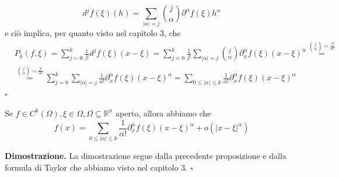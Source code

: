 	\[d^j f(\xi)(h) = \sum_{|\alpha| = j} \binom{j}{\alpha} \partial^{\alpha} f(\xi) h^{\alpha}\]
	e ciò implica, per quanto visto nel capitolo 3, che
	\begin{equation}\begin{aligned}
	&P_k(f, \xi) = \sum_{j=0}^k \frac{1}{j!} d^j f(\xi)(x - \xi) = \sum_{j=0}^k \frac{1}{j!} \sum_{|\alpha| = j} \binom{j}{\alpha} \partial^{\alpha}_x f(\xi) (x - \xi)^{\alpha} \stackrel{\binom{j}{\alpha} = \frac{j!}{\alpha!}}{=} \\
	&\stackrel{\binom{j}{\alpha} = \frac{j!}{\alpha!}}{=} \sum_{j=0}^k \sum_{|\alpha| = j} \frac{1}{\alpha!} \partial^{\alpha}_x f(\xi) (x - \xi)^{\alpha} = \sum_{0 \leq |\alpha| \leq k} \frac{1}{\alpha!} \partial^{\alpha}_x f(\xi) (x - \xi)^{\alpha}
	\end{aligned}\end{equation}
\hfill $\square$
%
\vspace{0.5cm}
\begin{theorem}[\textcolor{blue}{Formula di Taylor coi multi-indici}]
	Se $f \in C^k(\Omega), \xi \in \Omega, \Omega \subseteq \mathbb{R}^n$ aperto, allora abbiamo che
	$$
	f(x) = \sum_{0 \leq |\alpha| \leq k} \frac{1}{\alpha!} \partial_x^{\alpha} f(\xi) (x - \xi)^{\alpha} + o(|x-\xi|^{\alpha})
	$$
\end{theorem}
%
\noindent \textbf{Dimostrazione. }
	La dimostrazione segue dalla precedente proposizione e dalla formula di Taylor che abbiamo visto nel capitolo 3.
\hfill $\square$